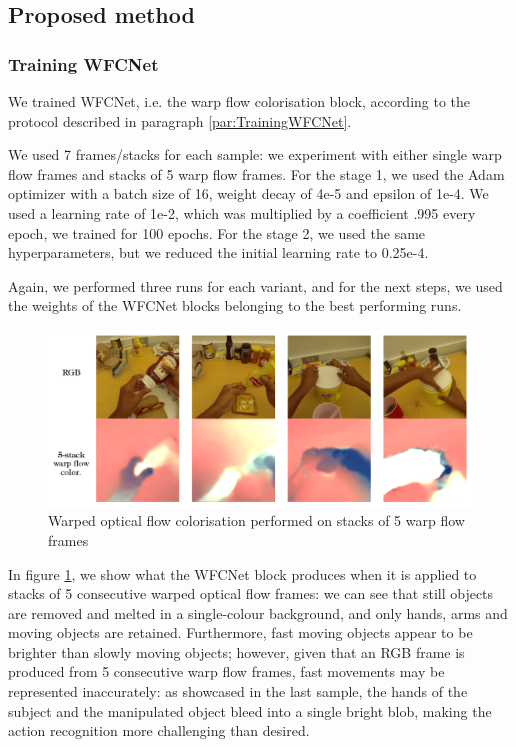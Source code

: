 \documentclass[10pt,twocolumn,letterpaper]{article}
\begin{document}
\pagebreak

\subsection{Proposed method}

\subsubsection{Training WFCNet}

We trained WFCNet, i.e. the warp flow colorisation block, according to the protocol described in paragraph \ref{par:TrainingWFCNet}.

We used 7 frames/stacks for each sample: we experiment with either single warp flow frames and stacks of 5 warp flow frames. For the stage 1, we used the Adam optimizer with a batch size of 16, weight decay of 4e-5 and epsilon of 1e-4. We used a learning rate of 1e-2, which was multiplied by a coefficient .995 every epoch, we trained for 100 epochs. For the stage 2, we used the same hyperparameters, but we reduced the initial learning rate to 0.25e-4.

Again, we performed three runs for each variant, and for the next steps, we used the weights of the WFCNet blocks belonging to the best performing runs.

\begin{figure}
	\begin{center}
		\includegraphics[width=\linewidth]{grafici/wfcnet_color_img.pdf}		
	\end{center}
	\caption{Warped optical flow colorisation performed on stacks of 5 warp flow frames}
	\label{fig:wfcnet_color_img}
\end{figure}

In figure \ref{fig:wfcnet_color_img}, we show what the WFCNet block produces when it is applied to stacks of 5 consecutive warped optical flow frames: we can see that still objects are removed and melted in a single-colour background, and only hands, arms and moving objects are retained. Furthermore, fast moving objects appear to be brighter than slowly moving objects; however, given that an RGB frame is produced from 5 consecutive warp flow frames, fast movements may be represented inaccurately: as showcased in the last sample, the hands of the subject and the manipulated object bleed into a single bright blob, making the action recognition more challenging than desired.
\end{document}
